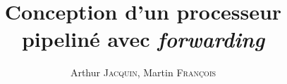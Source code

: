\documentclass{hibiscus}
\title{Conception d'un processeur pipeliné avec \textit{forwarding}}
\author{Arthur \textsc{Jacquin}, Martin \textsc{François}}
\begin{document}
\coverpage                      %
\foreword                       %
\tableofcontents









\bibliographyreferenceslist     %



\appendix
% 
\end{document}
